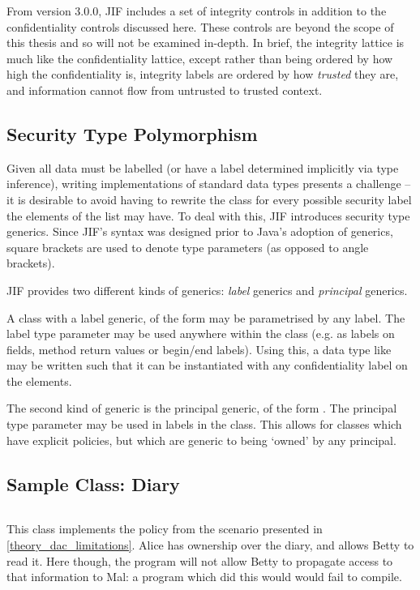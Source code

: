 From version 3.0.0, JIF includes a set of integrity controls in addition to the confidentiality controls discussed here. These controls are beyond the scope of this thesis and so will not be examined in-depth. In brief, the integrity lattice is much like the confidentiality lattice, except rather than being ordered by how high the confidentiality is, integrity labels are ordered by how \textit{trusted} they are, and information cannot flow from untrusted to trusted context.

\subsection{Security Type Polymorphism}

Given all data must be labelled (or have a label determined implicitly via type inference), writing implementations of standard data types presents a challenge -- it is desirable to avoid having to rewrite the  class for every possible security label the elements of the list may have. To deal with this, JIF introduces security type generics. Since JIF's syntax was designed prior to Java's adoption of generics, square brackets are used to denote type parameters (as opposed to angle brackets).

JIF provides two different kinds of generics: \textit{label} generics and \textit{principal} generics.

A class with a label generic, of the form  may be parametrised by any label. The label type parameter may be used anywhere within the class (e.g. as labels on fields, method return values or begin/end labels). Using this, a data type like  may be written such that it can be instantiated with any confidentiality label on the elements.

The second kind of generic is the principal generic, of the form . The principal type parameter may be used in labels in the class. This allows for classes which have explicit policies, but which are generic to being `owned' by any principal.

\newpage

\subsection{Sample Class: Diary}

\inputminted{java}{content/code_sections/jif_para_bg/Diary.jif}

This class implements the policy from the scenario presented in \ref{theory_dac_limitations}. Alice has ownership over the diary, and allows Betty to read it. Here though, the program will not allow Betty to propagate access to that information to Mal: a program which did this would would fail to compile.


